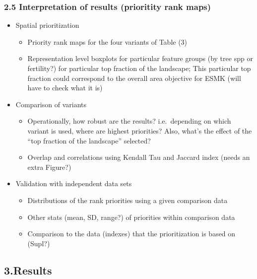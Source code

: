 \documentclass[]{article}
\begin{document}
\subsubsection{2.5 Interpretation of results (prioritity rank maps)}

\begin{itemize}
\itemsep1pt\parskip0pt
\item
  Spatial prioritization

  \begin{itemize}
  \itemsep1pt\parskip0pt
  \item
    Priority rank maps for the four variants of Table (3)
  \item
    Representation level boxplots for particular feature groups (by tree
    spp or fertility?) for particular top fraction of the landscape;
    This particular top fraction could correspond to the overall area
    objective for ESMK (will have to check what it is)
  \end{itemize}
\item
  Comparison of variants

  \begin{itemize}
  \itemsep1pt\parskip0pt
  \item
    Operationally, how robust are the results? i.e.~depending on which
    variant is used, where are highest priorities? Also, what's the
    effect of the ``top fraction of the landscape'' selected?
  \item
    Overlap and correlations using Kendall Tau and Jaccard index (needs
    an extra Figure?)
  \end{itemize}
\item
  Validation with independent data sets

  \begin{itemize}
  \itemsep1pt\parskip0pt
  \item
    Distributions of the rank priorities using a given comparison data
  \item
    Other stats (mean, SD, range?) of priorities within comparison data
  \item
    Comparison to the data (indexes) that the prioritization is based on
    (Supl?)
  \end{itemize}
\end{itemize}

\subsection{3.Results}
\end{document}
